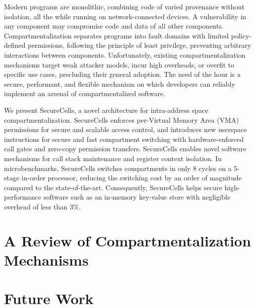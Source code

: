 \documentclass[lablogo]{thesis}
\begin{document}
Modern programs are monolithic, combining code of varied provenance without 
isolation, all the while running on network-connected devices. 
A vulnerability in any component may compromise code and data of all other 
components. 
Compartmentalization separates programs into fault domains with limited 
policy-defined permissions, following the principle of least privilege, 
preventing arbitrary interactions between components. 
Unfortunately, existing compartmentalization mechanisms target weak attacker 
models, incur high overheads, or overfit to specific use cases, precluding 
their general adoption. 
The need of the hour is a secure, performant, and flexible mechanism on which 
developers can reliably implement an arsenal of compartmentalized software. 

We present SecureCells, a novel architecture for intra-address space 
compartmentalization. 
SecureCells enforces per-Virtual Memory Area (VMA) permissions for secure and
scalable access control, and introduces new userspace instructions for 
secure and fast compartment switching with hardware-enforced call gates and 
zero-copy permission transfers. 
SecureCells enables novel software mechanisms for call stack maintenance and 
register context isolation. 
In microbenchmarks, SecureCells switches compartments in only 8 cycles on a 
5-stage in-order processor, reducing the switching cost by an order of magnitude
compared to the state-of-the-art. 
Consequently, SecureCells helps secure high-performance software such as an 
in-memory key-value store with negligible overhead of less than $3\%$.


\chapter{A Review of Compartmentalization Mechanisms }
\label{ch:compreview}



\chapter{Future Work}
\label{ch:future}

\end{document}
